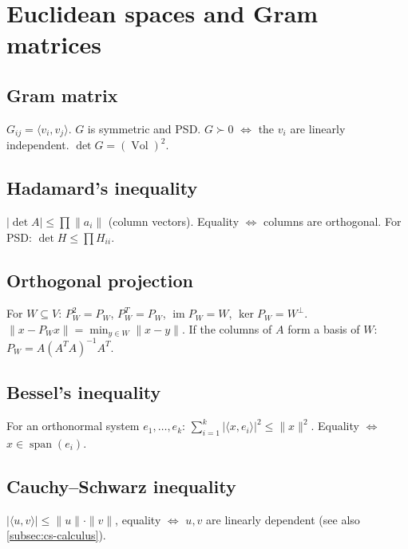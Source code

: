 \medskip

\section{Euclidean spaces and Gram matrices}
\label{sec:gram}

\subsection{Gram matrix}
\label{subsec:gram-matrix}

$G_{ij}=\langle v_i,v_j\rangle$. $G$ is symmetric and PSD. $G\succ0$ $\iff$ the $v_i$ are linearly independent. $\det G=(\operatorname{Vol})^2$.

\subsection{Hadamard's inequality}
\label{subsec:hadamard}

$|\det A|\le\prod\|a_i\|$ (column vectors). Equality $\iff$ columns are orthogonal. For PSD: $\det H\le\prod H_{ii}$.

\subsection{Orthogonal projection}
\label{subsec:orthogonal-projection}

For $W\subseteq V$: $P_W^2=P_W$, $P_W^T=P_W$, $\operatorname{im}P_W=W$, $\ker P_W=W^\perp$. $\|x-P_Wx\|=\min_{y\in W}\|x-y\|$. If the columns of $A$ form a basis of $W$: $P_W=A(A^TA)^{-1}A^T$.

\subsection{Bessel's inequality}
\label{subsec:bessel}

For an orthonormal system $e_1,\dots,e_k$: $\sum_{i=1}^k|\langle x,e_i\rangle|^2\le\|x\|^2$. Equality $\iff$ $x\in\operatorname{span}(e_i)$.

\subsection{Cauchy--Schwarz inequality}
\label{subsec:cauchy-schwarz-linalg}

$|\langle u,v\rangle|\le\|u\|\cdot\|v\|$, equality $\iff$ $u,v$ are linearly dependent (see also \ref{subsec:cs-calculus}).

\medskip


